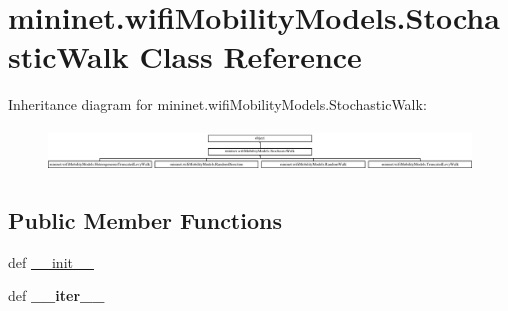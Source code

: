 \hypertarget{classmininet_1_1wifiMobilityModels_1_1StochasticWalk}{\section{mininet.\-wifi\-Mobility\-Models.\-Stochastic\-Walk Class Reference}
\label{classmininet_1_1wifiMobilityModels_1_1StochasticWalk}
}
Inheritance diagram for mininet.\-wifi\-Mobility\-Models.\-Stochastic\-Walk\-:\begin{figure}[H]
\begin{center}
\leavevmode
\includegraphics[height=1.138211cm]{classmininet_1_1wifiMobilityModels_1_1StochasticWalk}
\end{center}
\end{figure}
\subsection*{Public Member Functions}
\begin{DoxyCompactItemize}
\item 
def \hyperlink{classmininet_1_1wifiMobilityModels_1_1StochasticWalk_a2fc5338be6b275bc332d68c674900bd0}{\-\_\-\-\_\-init\-\_\-\-\_\-}
\item 
\hypertarget{classmininet_1_1wifiMobilityModels_1_1StochasticWalk_a354a1d28f552cd04a0537f64dbf262e5}{def {\bfseries \-\_\-\-\_\-iter\-\_\-\-\_\-}}\label{classmininet_1_1wifiMobilityModels_1_1StochasticWalk_a354a1d28f552cd04a0537f64dbf262e5}

\end{DoxyCompactItemize}
